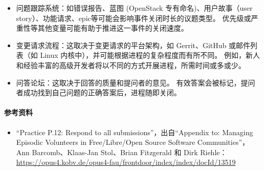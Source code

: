 \begin{itemize}
\tightlist
\item
  问题跟踪系统：如错误报告、蓝图 (OpenStack 专有命名)、用户故事（user
  story）、功能请求、epic等可能会影响事件关闭时长的议题类型。
  优先级或严重性等其他变量可能有助于推进这一事件的关闭速度。
\item
  变更请求流程：这取决于变更请求的平台架构，如 Gerrit、GitHub
  或邮件列表（如 Linux 内核中），并可能根据进程的复杂程度而有所不同。
  例如，新人和经验丰富的高级开发者将以不同的方式开展进程，所需时间或多或少。
\item
  问答论坛：这取决于回答的质量和提问者的意见。
  有效答案会被标记，提问者成功找到自己问题的正确答案后，进程随即关闭。
\end{itemize}

\hypertarget{ux53c2ux8003ux8d44ux6599}{%
\paragraph{参考资料}\label{ux53c2ux8003ux8d44ux6599}}

\begin{itemize}
\tightlist
\item
  ``Practice P.12: Respond to all submissions''，出自``Appendix to:
  Managing Episodic Volunteers in Free/Libre/Open Source Software
  Communities''，Ann Barcomb、Klaas-Jan Stol、Brian Fitzgerald 和 Dirk
  Riehle：\href{https://opus4.kobv.de/opus4-fau/frontdoor/index/index/docId/13519}{https://opus4.kobv.de/opus4-fau/frontdoor/index/index/docId/13519}
\end{itemize}
